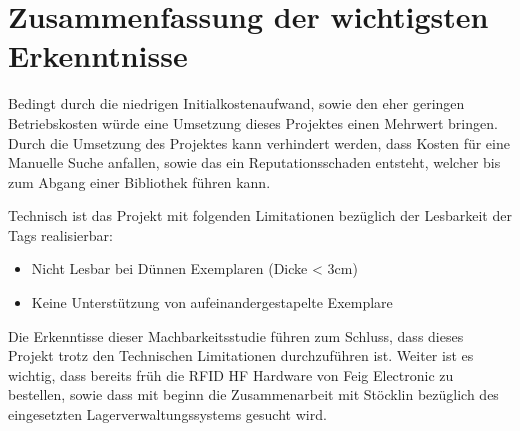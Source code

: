\chapter{Zusammenfassung der wichtigsten Erkenntnisse}
Bedingt durch die niedrigen Initialkostenaufwand, sowie den eher geringen Betriebskosten würde eine Umsetzung dieses Projektes einen Mehrwert bringen.
Durch die Umsetzung des Projektes kann verhindert werden, dass Kosten für eine Manuelle Suche anfallen, sowie das ein Reputationsschaden entsteht, welcher bis zum Abgang einer Bibliothek führen kann.

\vspace{2em}

\noindent
Technisch ist das Projekt mit folgenden Limitationen bezüglich der Lesbarkeit der Tags realisierbar:
\begin{itemize}
	\item Nicht Lesbar bei Dünnen Exemplaren (Dicke < 3cm)
	\item Keine Unterstützung von aufeinandergestapelte Exemplare
\end{itemize}

\vspace{2em}

\noindent
Die Erkenntisse dieser Machbarkeitsstudie führen zum Schluss, dass dieses Projekt trotz den Technischen Limitationen durchzuführen ist.
Weiter ist es wichtig, dass bereits früh die RFID HF Hardware von Feig Electronic zu bestellen, sowie dass mit beginn die Zusammenarbeit mit Stöcklin bezüglich des eingesetzten Lagerverwaltungssystems gesucht wird.